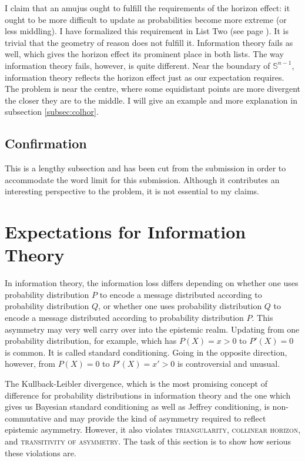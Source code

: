 \documentclass[11pt]{article}
\begin{document}
I claim that an amujus ought to fulfill the requirements of the
horizon effect: it ought to be more difficult to update as
probabilities become more extreme (or less middling). I have
formalized this requirement in List Two (see page
\pageref{page:listtwo}). It is trivial that the geometry of reason
does not fulfill it. Information theory fails as well, which gives the
horizon effect its prominent place in both lists. The way information
theory fails, however, is quite different. Near the boundary of
$\mathbb{S}^{n-1}$, information theory reflects the horizon effect
just as our expectation requires. The problem is near the centre,
where some equidistant points are more divergent the closer they are
to the middle. I will give an example and more explanation in
subsection \ref{subsec:colhor}.

\subsection{Confirmation}
\label{Confirmation}

This is a lengthy subsection and has been cut from the submission in
order to accommodate the word limit for this submission. Although it
contributes an interesting perspective to the problem, it is not
essential to my claims.

\section{Expectations for Information Theory}
\label{sec:expinfth}

In information theory, the information loss differs depending on
whether one uses probability distribution $P$ to encode a message
distributed according to probability distribution $Q$, or whether one
uses probability distribution $Q$ to encode a message distributed
according to probability distribution $P$. This asymmetry may very
well carry over into the epistemic realm. Updating from one
probability distribution, for example, which has $P(X)=x>0$ to
$P'(X)=0$ is common. It is called standard conditioning. Going in the
opposite direction, however, from $P(X)=0$ to $P'(X)=x'>0$ is
controversial and unusual.

The Kullback-Leibler divergence, which is the most promising concept
of difference for probability distributions in information theory and
the one which gives us Bayesian standard conditioning as well as
Jeffrey conditioning, is non-commutative and may provide the kind of
asymmetry required to reflect epistemic asymmetry. However, it also
violates \textsc{triangularity}, \textsc{collinear horizon}, and
\textsc{transitivity of asymmetry}. The task of this section is to
show how serious these violations are.
\end{document}
